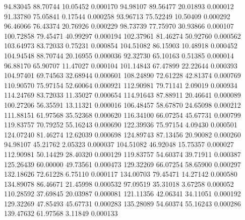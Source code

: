        94.83045       88.70744       10.05452       0.000170
       94.98107       89.56477       20.01893       0.000012
       91.33780       75.05841        0.17544       0.000258
       93.96713       75.52249       10.50409       0.000292
       96.46066       76.43374       20.76926       0.000229
       98.73739       77.75970       30.93866       0.000107
      100.72858       79.45471       40.99297       0.000194
      102.37961       81.46274       50.92760       0.000562
      103.64973       83.72033        0.75231       0.000854
      104.51082       86.15903       10.48918       0.000452
      104.94548       88.70744       20.16955       0.000036
       92.32730       65.10163        0.51385       0.000014
       96.88170       65.90707       11.47027       0.000104
      101.14843       67.47899       22.22644       0.000393
      104.97401       69.74563       32.68944       0.000601
      108.24890       72.61228       42.81374       0.000769
      110.90570       75.97154       52.60064       0.000921
      112.90981       79.71141        2.09019       0.000934
      114.24769       83.72033       11.35027       0.000654
      114.91643       87.88911       20.46641       0.000089
      100.27206       56.35591       13.11321       0.000016
      106.48457       58.67870       24.65098       0.000212
      111.88151       61.97568       35.52368       0.000620
      116.34100       66.07254       45.67731       0.000799
      119.83757       70.79252       55.16243       0.000690
      122.39936       75.97154        4.09430       0.000501
      124.07240       81.46274       12.62039       0.000698
      124.89743       87.13456       20.90082       0.000260
       94.98107       45.21762        2.05323       0.000037
      104.51082       46.92048       15.75357       0.000027
      112.90981       50.14429       28.40320       0.000129
      119.83757       54.60374       39.71911       0.000387
      125.26439       60.00000       49.73561       0.000473
      129.32269       66.07254       58.65900       0.000297
      132.18626       72.61228        6.75110       0.000117
      134.00703       79.45471       14.27142       0.000580
      134.89078       86.46671       21.45998       0.000532
       97.09519       35.31018        3.67258       0.000052
      110.28592       37.69845       20.03987       0.000081
      121.11356       42.06341       34.11051       0.000192
      129.32269       47.85493       45.67731       0.000283
      135.28089       54.60374       55.16243       0.000286
      139.47632       61.97568        3.11849       0.000133

